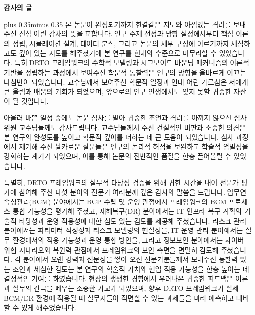 
\thispagestyle{empty}  %

\begin{center}
  {\fontsize{16}{22}\selectfont\bfseries 감사의 글}
\end{center}

\vspace{1.5cm}

{\fontsize{11}{22}\selectfont{}\setlength{\parindent}{2em}\setlength{\parskip}{6pt}\justifying
{}\font plus 0.35\font minus 0.35\font
본 논문이 완성되기까지 한결같은 지도와 아낌없는 격려를 보내주신
 진심 어린 감사의 뜻을 표합니다.
연구 주제 선정과 방향 설정에서부터 핵심 이론의 정립, 시뮬레이션 설계,
데이터 분석, 그리고 논문의 세부 구성에 이르기까지
세심하고도 깊이 있는 지도를 해주셨기에
본 연구를 현재의 수준으로 마무리할 수 있었습니다.
특히 DRTO 프레임워크의 수학적 모델링과 시그모이드 바운딩 메커니즘의
이론적 기반을 정립하는 과정에서 보여주신 학문적 통찰력은
연구의 방향을 올바르게 이끄는 나침반이 되었습니다.
교수님께서 보여주신 학문적 열정과 인내 어린 가르침은
저에게 큰 울림과 배움의 기회가 되었으며, 앞으로의 연구 인생에서도
잊지 못할 귀중한 자산이 될 것입니다.

아울러 바쁜 일정 중에도 논문 심사를 맡아
귀중한 조언과 격려를 아끼지 않으신 심사위원 교수님들께도 감사드립니다.
교수님들께서 주신 건설적인 비판과 소중한 의견은
본 연구의 완성도를 높이고 학문적 깊이를 더하는 데 큰 도움이 되었습니다.
심사 과정에서 제기해 주신 날카로운 질문들은
연구의 논리적 허점을 보완하고 학술적 엄밀성을 강화하는 계기가 되었으며,
이를 통해 논문의 전반적인 품질을 한층 끌어올릴 수 있었습니다.

특별히, DRTO 프레임워크의 실무적 타당성 검증을 위해
귀한 시간을 내어 전문가 평가에 참여해 주신 다섯 분야의 전문가 여러분께
깊은 감사의 말씀을 드립니다.
업무연속성관리(BCM) 분야에서는 BCP 수립 및 운영 관점에서
프레임워크의 BCM 프로세스 통합 가능성을 평가해 주셨고,
재해복구(DR) 분야에서는 IT 인프라 복구 계획의 기술적 타당성과
운영 적용성에 대한 심도 있는 검토를 제공해 주셨습니다.
리스크 관리 분야에서는 파라미터 적정성과 리스크 모델링의 현실성을,
IT 운영 관리 분야에서는 실무 환경에서의 적용 가능성과 운영 통합 방안을,
그리고 정보보안 분야에서는 사이버 위협 시나리오와 복원력 관점에서
프레임워크의 보안 측면을 면밀히 검토해 주셨습니다.
각 분야에서 오랜 경력과 전문성을 쌓아 오신 전문가분들께서
보내주신 통찰력 있는 조언과 세심한 검토는
본 연구의 학술적 가치와 현업 적용 가능성을 한층 높이는 데
결정적인 기여를 하였습니다.
현장의 생생한 경험에서 우러나온 귀중한 피드백은
이론과 실무의 간극을 메우는 소중한 가교가 되었으며,
향후 DRTO 프레임워크가 실제 BCM/DR 환경에 적용될 때
실무자들이 직면할 수 있는 과제들을 미리 예측하고 대비할 수 있게 해주었습니다.

}
